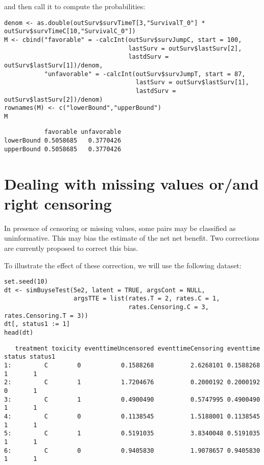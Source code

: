 \documentclass[12pt]{article}
\begin{document}
and then call it to compute the probabilities:
\lstset{language=r,label= ,caption= ,captionpos=b,numbers=none}
\begin{lstlisting}
denom <- as.double(outSurv$survTimeT[3,"SurvivalT_0"] * outSurv$survTimeC[10,"SurvivalC_0"])
M <- cbind("favorable" = -calcInt(outSurv$survJumpC, start = 100, 
								  lastSurv = outSurv$lastSurv[2],
								  lastdSurv = outSurv$lastSurv[1])/denom,
		   "unfavorable" = -calcInt(outSurv$survJumpT, start = 87, 
									lastSurv = outSurv$lastSurv[1],
									lastdSurv = outSurv$lastSurv[2])/denom)
rownames(M) <- c("lowerBound","upperBound")
M
\end{lstlisting}

\begin{verbatim}
           favorable unfavorable
lowerBound 0.5058685   0.3770426
upperBound 0.5058685   0.3770426
\end{verbatim}

\clearpage

\section{Dealing with missing values or/and right censoring}
\label{sec:org62d52e0}

In presence of censoring or missing values, some pairs may be
classified as uninformative. This may bias the estimate of the net net
benefit. Two corrections are currently proposed to correct this bias.

\bigskip

To illustrate the effect of these correction, we will use the
following dataset:
\lstset{language=r,label= ,caption= ,captionpos=b,numbers=none}
\begin{lstlisting}
set.seed(10)
dt <- simBuyseTest(5e2, latent = TRUE, argsCont = NULL,
				   argsTTE = list(rates.T = 2, rates.C = 1,
								  rates.Censoring.C = 3, rates.Censoring.T = 3))
dt[, status1 := 1]
head(dt)
\end{lstlisting}

\begin{verbatim}
   treatment toxicity eventtimeUncensored eventtimeCensoring eventtime status status1
1:         C        0           0.1588268          2.6268101 0.1588268      1       1
2:         C        1           1.7204676          0.2000192 0.2000192      0       1
3:         C        1           0.4900490          0.5747995 0.4900490      1       1
4:         C        0           0.1138545          1.5188001 0.1138545      1       1
5:         C        1           0.5191035          3.8340048 0.5191035      1       1
6:         C        0           0.9405830          1.9078657 0.9405830      1       1
\end{verbatim}
\end{document}
